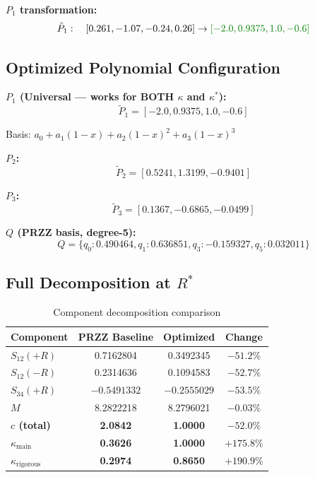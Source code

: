 \documentclass[11pt]{article}
\begin{document}
\textbf{$P_1$ transformation:}
\begin{equation}
\tilde{P}_1: \quad [0.261, -1.07, -0.24, 0.26] \to \textcolor{improvement}{[-2.0, 0.9375, 1.0, -0.6]}
\end{equation}

\subsection{Optimized Polynomial Configuration}

\textbf{$P_1$ (Universal --- works for BOTH $\kappa$ and $\kappa^*$):}
\begin{equation}
\boxed{\tilde{P}_1 = [-2.0, 0.9375, 1.0, -0.6]}
\end{equation}

Basis: $a_0 + a_1(1-x) + a_2(1-x)^2 + a_3(1-x)^3$

\textbf{$P_2$:}
\begin{equation}
\tilde{P}_2 = [0.5241, 1.3199, -0.9401]
\end{equation}

\textbf{$P_3$:}
\begin{equation}
\tilde{P}_3 = [0.1367, -0.6865, -0.0499]
\end{equation}

\textbf{$Q$ (PRZZ basis, degree-5):}
\begin{equation}
Q = \{q_0: 0.490464, q_1: 0.636851, q_3: -0.159327, q_5: 0.032011\}
\end{equation}

\subsection{Full Decomposition at $R^*$}

\begin{table}[h]
\centering
\caption{Component decomposition comparison}
\begin{tabular}{lccc}
\toprule
Component & PRZZ Baseline & Optimized & Change \\
\midrule
$S_{12}(+R)$ & 0.7162804 & 0.3492345 & $-51.2\%$ \\
$S_{12}(-R)$ & 0.2314636 & 0.1094583 & $-52.7\%$ \\
$S_{34}(+R)$ & $-0.5491332$ & $-0.2555029$ & $-53.5\%$ \\
$M$ & 8.2822218 & 8.2796021 & $-0.03\%$ \\
\midrule
\textbf{$c$ (total)} & \textbf{2.0842} & \textbf{1.0000} & \textbf{$-52.0\%$} \\
\textbf{$\kappa_{\text{main}}$} & \textbf{0.3626} & \textbf{1.0000} & \textbf{$+175.8\%$} \\
\textbf{$\kappa_{\text{rigorous}}$} & \textbf{0.2974} & \textbf{0.8650} & \textbf{$+190.9\%$} \\
\bottomrule
\end{tabular}
\end{table}
\end{document}
